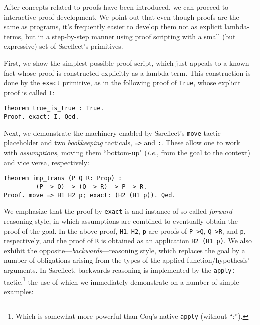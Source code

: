\documentclass[blockstyle,preprint]{sigplanconf}
\newcommand{\an}[1]{\textcolor{red}{(Aleks: {#1})}}
\newcommand{\code}[1]{\lstinline{#1}}
\newcommand{\ie}{\emph{i.e.}\xspace}
\begin{document}
%
After concepts related to proofs have been introduced, we can proceed
to interactive proof development. We point out that even though proofs
are the same as programs, it's frequently easier to develop them not
as explicit lambda-terms, but in a step-by-step manner using proof
scripting with a small (but expressive) set of Ssreflect's primitives.
%

First, we show the simplest possible proof script, which just appeals
to a known fact whose proof is constructed explicitly as a
lambda-term.  This construction is done by the \code{exact} primitive,
as in the following proof of \code{True}, whose explicit proof is
called \code{I}:
%
\begin{lstlisting}
Theorem true_is_true : True.
Proof. exact: I. Qed.
\end{lstlisting}
%
Next, we demonstrate the machinery enabled by Ssreflect's \code{move}
tactic placeholder and two \emph{bookkeeping} tacticals, \code{=>} and
\code{:}. These allow one to work with \emph{assumptions}, moving them
``bottom-up" (\ie, from the goal to the context) and vice versa,
respectively:
%
\begin{lstlisting}
Theorem imp_trans (P Q R: Prop) : 
         (P -> Q) -> (Q -> R) -> P -> R.
Proof. move => H1 H2 p; exact: (H2 (H1 p)). Qed.
\end{lstlisting}
%
We emphasize that the proof by \code{exact} is and instance of
so-called \emph{forward} reasoning style, in which assumptions are
combined to eventually obtain the proof of the goal. In the above
proof, \code{H1}, \code{H2}, \code{p} are proofs of \code{P->Q},
\code{Q->R}, and \code{p}, respectively, and the proof of \code{R} is
obtained as an application \code{H2 (H1 p)}. We also exhibit the
opposite---\emph{backwards}---reasoning style, which replaces the goal
by a number of obligations arising from the types of the applied
function/hypothesis' arguments. In Ssreflect, backwards reasoning is
implemented by the \code{apply:} tactic,\footnote{Which is somewhat
  more powerful than Coq's native \code{apply} (without ``:'').} the
use of which we immediately demonstrate on a number of simple
examples:
\end{document}
